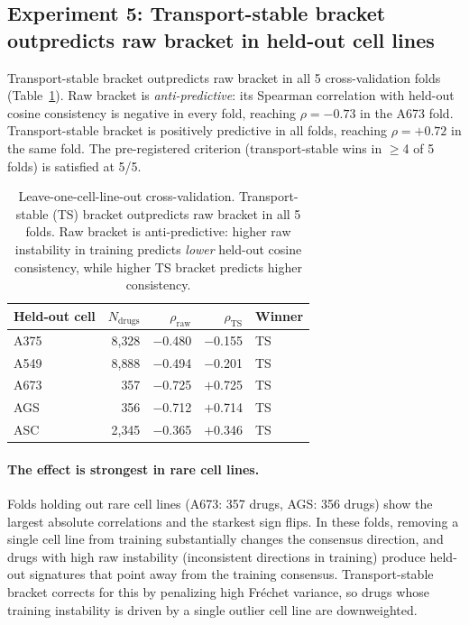 \documentclass{article}
\begin{document}
\subsection{Experiment 5: Transport-stable bracket outpredicts raw bracket in held-out cell lines}

Transport-stable bracket outpredicts raw bracket in all 5 cross-validation
folds (Table~\ref{tab:transport}). Raw bracket is \emph{anti-predictive}:
its Spearman correlation with held-out cosine consistency is negative in
every fold, reaching $\rho = -0.73$ in the A673 fold. Transport-stable
bracket is positively predictive in all folds, reaching $\rho = +0.72$ in
the same fold. The pre-registered criterion (transport-stable wins in
$\geq$4 of 5 folds) is satisfied at 5/5.

\begin{table}[t]
\centering
\caption{Leave-one-cell-line-out cross-validation. Transport-stable (TS)
bracket outpredicts raw bracket in all 5 folds. Raw bracket is
anti-predictive: higher raw instability in training predicts \emph{lower}
held-out cosine consistency, while higher TS bracket predicts higher
consistency.}
\label{tab:transport}
\small
\begin{tabular}{lrrrl}
\toprule
Held-out cell & $N_{\text{drugs}}$ & $\rho_{\text{raw}}$ & $\rho_{\text{TS}}$ & Winner \\
\midrule
A375 & 8{,}328 & $-$0.480 & $-$0.155 & TS \\
A549 & 8{,}888 & $-$0.494 & $-$0.201 & TS \\
A673 & 357 & $-$0.725 & $+$0.725 & TS \\
AGS & 356 & $-$0.712 & $+$0.714 & TS \\
ASC & 2{,}345 & $-$0.365 & $+$0.346 & TS \\
\bottomrule
\end{tabular}
\end{table}

\paragraph{The effect is strongest in rare cell lines.}
Folds holding out rare cell lines (A673: 357 drugs, AGS: 356 drugs) show
the largest absolute correlations and the starkest sign flips. In these
folds, removing a single cell line from training substantially changes the
consensus direction, and drugs with high raw instability (inconsistent
directions in training) produce held-out signatures that point away from
the training consensus. Transport-stable bracket corrects for this by
penalizing high Fr\'{e}chet variance, so drugs whose training instability
is driven by a single outlier cell line are downweighted.
\end{document}
